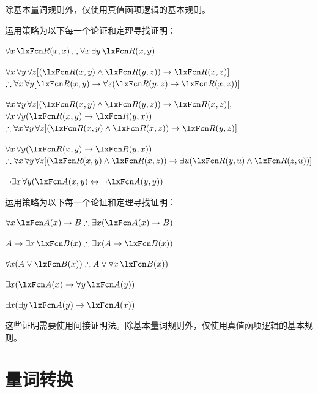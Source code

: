 除基本量词规则外，仅使用真值函项逻辑的基本规则。

\problempart
运用策略为以下每一个论证和定理寻找证明：


\begin{compactlist}
\item $\forall x\,\atom{R}{x,x} \therefore \forall x\,\exists y\,\atom{R}{x,y}$
\item $\forall x\,\forall y\,\forall z[(\atom{R}{x,y} \eand \atom{R}{y,z}) \eif \atom{R}{x,z}]$ \\
$\therefore \forall x\,\forall y[\atom{R}{x,y} \eif \forall z(\atom{R}{y,z} \eif \atom{R}{x,z})]$
\item $\forall x\,\forall y\,\forall z[(\atom{R}{x,y} \eand \atom{R}{y,z}) \eif \atom{R}{x,z}],$\\ $\forall x\,\forall y(\atom{R}{x,y} \eif \atom{R}{y, x})$ \\ $\therefore \forall x\,\forall y\,\forall z[(\atom{R}{x,y} \eand \atom{R}{x,z}) \eif \atom{R}{y,z}]$
\item $\forall x\,\forall y(\atom{R}{x,y} \eif \atom{R}{y, x})$ \\$\therefore \forall x\,\forall y\,\forall z[(\atom{R}{x,y} \eand \atom{R}{x,z}) \eif \exists u(\atom{R}{y,u} \eand \atom{R}{z,u})]$
\item $\enot \exists x\,\forall y (\atom{A}{x, y} \eiff \lnot\atom{A}{y, y})$
\end{compactlist}

\problempart
运用策略为以下每一个论证和定理寻找证明：


\begin{compactlist}
\item $\forall x\,\atom{A}{x} \eif B \therefore \exists x(\atom{A}{x} \eif B)$
\item $A \eif \exists x\, \atom{B}{x} \therefore \exists x(A \eif \atom{B}{x})$
\item $\forall x(A \eor \atom{B}{x}) \therefore A \eor \forall x\,\atom{B}{x})$
\item $\exists x(\atom{A}{x} \eif \forall y\,\atom{A}{y})$
\item $\exists x(\exists y\,\atom{A}{y} \eif \atom{A}{x})$
\end{compactlist}


这些证明需要使用间接证明法。除基本量词规则外，仅使用真值函项逻辑的基本规则。

\chapter{量词转换}\label{s:CQ}

